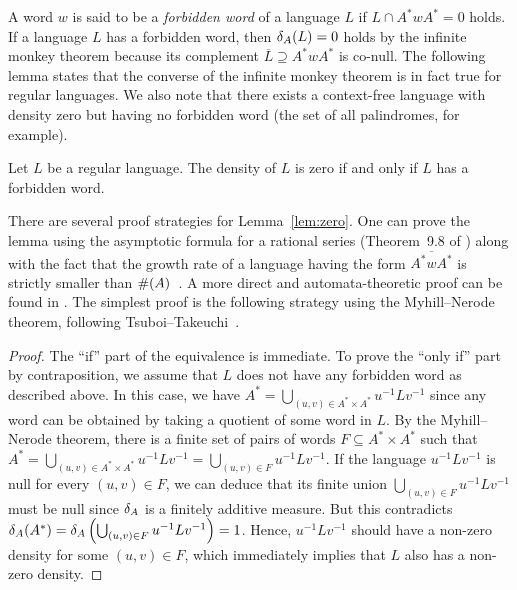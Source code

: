 A word \(w\) is said to be a \emph{forbidden word} of a language \(L\) if \(L \cap A^* w A^* = 0\) holds.
If a language \(L\) has a forbidden word, then \(\delta_{A}(L) = 0\) holds by the infinite monkey theorem because its complement \(\overline{L} \supseteq A^* w A^*\) is co-null.
The following lemma states that the converse of the infinite monkey theorem is in fact true for regular languages.
We also note that there exists a context-free language with density zero but having no forbidden word (the set of all palindromes, for example).
\begin{lemma}\label{lem:zero}
Let \(L\) be a regular language.
The density of \(L\) is zero if and only if \(L\) has a forbidden word.
\end{lemma}
There are several proof strategies for Lemma~\ref{lem:zero}.
One can prove the lemma using the asymptotic formula for a rational series (\cf Theorem~9.8 of \cite{Salomaa:1978:ATA:578607}) along with the fact that the growth rate of a language having the form \(\overline{A^* w A^*}\) is strictly smaller than \(\#\!\left(A\right)\)~\cite{Kim1977SomeCP}.
A more direct and automata-theoretic proof can be found in \cite{Ryoma}.
The simplest proof is the following strategy using the Myhill--Nerode theorem, following Tsuboi--Takeuchi~\cite{TTmonkey}.
\begin{proof}
The ``if'' part of the equivalence is immediate.
To prove the ``only if'' part by contraposition, we assume that \(L\) does not have any forbidden word as described above.
In this case, we have \(A^* = \bigcup_{(u,v) \in A^* \times A^*} u^{-1} L v^{-1}\) since any word can be obtained by taking a quotient of some word in \(L\).
By the Myhill--Nerode theorem, there is a finite set of pairs of words
\(F \subseteq A^* \times A^*\) such that
\(A^* = \bigcup_{(u,v) \in A^* \times A^*} u^{-1} L v^{-1} = \bigcup_{(u,v) \in F} u^{-1} L v^{-1}\).
If the language \(u^{-1} L v^{-1}\) is null for every \((u,v) \in F\), we can deduce that its finite union \(\bigcup_{(u,v) \in F} u^{-1} L v^{-1}\) must be null since \(\delta_{A}\) is a finitely additive measure.
 But this contradicts \(\delta_{A}(A^*) = \delta_{A}\left(\bigcup_{(u,v) \in F} u^{-1} L v^{-1}\right) = 1\).
Hence, \(u^{-1} L v^{-1}\) should have a non-zero density for some \((u,v) \in F\), which immediately implies that \(L\) also has a non-zero density.
\end{proof}


